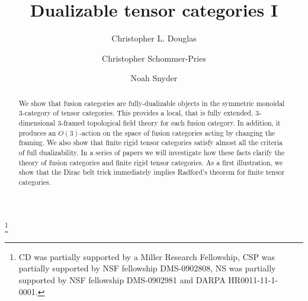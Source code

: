 \documentclass{amsart}
\begin{document}
\title{Dualizable tensor categories I}

\begin{abstract}
We show that fusion categories are fully-dualizable objects in the symmetric monoidal 3-category of tensor categories.  This provides a local, that is fully extended, 3-dimensional 3-framed topological field theory for each fusion category. In addition, it produces an $O(3)$-action on the space of fusion categories acting by changing the framing. We also show that finite rigid tensor categories satisfy almost all the criteria of full dualizability.  In a series of papers we will investigate how these facts clarify the theory of fusion categories and finite rigid tensor categories.  As a first illustration, we show that the Dirac belt trick immediately implies Radford's theorem for finite tensor categories.
\end{abstract}

%
%
	
\author{Christopher L. Douglas}
\address{Mathematical Institute\\ University of Oxford\\ Oxford OX1 3LB\\ United Kingdom}
      	
\author{Christopher Schommer-Pries}
\address{Department of Mathematics\\ Massachusetts Institute of Technology\\ Cambridge, MA 02139\\ USA}

\author{Noah Snyder}
\address{Department of Mathematics\\ Columbia University\\ New York, NY 10027\\ USA}

\thanks{CD was partially supported by a Miller Research Fellowship, CSP was partially supported by NSF fellowship DMS-0902808,  NS was partially supported by NSF fellowship DMS-0902981 and DARPA HR0011-11-1-0001.
}
\end{document}
